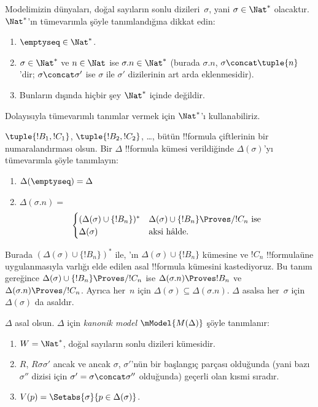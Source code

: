 



Modelimizin dünyaları, doğal sayıların sonlu dizileri~$\sigma$, yani
$\sigma\in\Nat^*$ olacaktır. $\Nat^*$'ın tümevarımla şöyle tanımlandığına
dikkat edin:
\begin{enumerate}
\item $\emptyseq\in\Nat^*$.
\item $\sigma\in\Nat^*$ ve $n\in\Nat$ ise $\sigma.n\in\Nat^*$ (burada
  $\sigma.n$, $\sigma\concat\tuple{n}$'dir; $\sigma\concat\sigma'$ ise
  $\sigma$ ile $\sigma'$ dizilerinin art arda eklenmesidir).
\item Bunların dışında hiçbir şey $\Nat^*$ içinde değildir.
\end{enumerate}
Dolayısıyla tümevarımlı tanımlar vermek için $\Nat^*$'ı kullanabiliriz.

$\tuple{!B_1,!C_1}$, $\tuple{!B_2,!C_2}$, \dots, bütün !!{formula}
çiftlerinin bir numaralandırması olsun. Bir $\Delta$ !!{formula} kümesi
verildiğinde $\Delta(\sigma)$'yı tümevarımla şöyle tanımlayın:
\begin{enumerate}
\item $\Delta(\emptyseq)=\Delta$
\item $\Delta(\sigma.n)={}$
  \[
  \begin{cases}
    (\Delta(\sigma) \cup \{!B_n\})^* &
    \text{$\Delta(\sigma)\cup\{!B_n\}\Proves/ !C_n$ ise} \\
    \Delta(\sigma) & \text{aksi hâlde.}
  \end{cases}
  \]
\end{enumerate}
Burada $(\Delta(\sigma)\cup\{!B_n\})^*$ ile,
'ın $\Delta(\sigma)\cup\{!B_n\}$ kümesine
ve $!C_n$ !!{formula}{}üne uygulanmasıyla varlığı elde edilen asal
!!{formula} kümesini kastediyoruz. Bu tanım gereğince
$\Delta(\sigma)\cup\{!B_n\}\Proves/ !C_n$ ise
$\Delta(\sigma.n)\Proves !B_n$ ve $\Delta(\sigma.n)\Proves/ !C_n$.
Ayrıca her~$n$ için $\Delta(\sigma)\subseteq\Delta(\sigma.n)$.
$\Delta$ asalsa her~$\sigma$ için $\Delta(\sigma)$ da asaldır.

\begin{defn}
  $\Delta$ asal olsun. $\Delta$ için \emph{kanonik model}
  $\mModel{M(\Delta)}$ şöyle tanımlanır:
  \begin{enumerate}
  \item $W=\Nat^*$, doğal sayıların sonlu dizileri kümesidir.
  \item $R$, $R\sigma\sigma'$ ancak ve ancak $\sigma$, $\sigma'$'nün bir
    başlangıç parçası olduğunda (yani bazı $\sigma''$ dizisi için
    $\sigma'=\sigma\concat\sigma''$ olduğunda) geçerli olan kısmi sıradır.
  \item $V(p)=\Setabs{\sigma}{p\in\Delta(\sigma)}$.
  \end{enumerate}
\end{defn}

